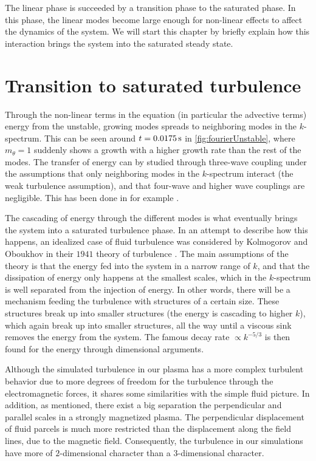 %
The linear phase is succeeded by a transition phase to the saturated phase.
In this phase, the linear modes become large enough for non-linear effects to affect the dynamics of the system.
We will start this chapter by briefly explain how this interaction brings the system into the saturated steady state.

\section{Transition to saturated turbulence}
Through the non-linear terms in the equation (in particular the advective terms) energy from the unstable, growing modes spreads to neighboring modes in the $k$-spectrum.
This can be seen around $t=0.0175\, \text{s}$ in \cref{fig:fourierUnstable}, where $m_\theta=1$ suddenly shows a growth with a higher growth rate than the rest of the modes.
The transfer of energy can by studied through three-wave coupling under the assumptions that only neighboring modes in the $k$-spectrum interact (the weak turbulence assumption), and that four-wave and higher wave couplings are negligible.
This has been done in for example \cite{Ritz1989,Knorr1990}.

The cascading of energy through the different modes is what eventually brings the system into a saturated turbulence phase.
In an attempt to describe how this happens, an idealized case of fluid turbulence was considered by Kolmogorov and Oboukhov in their $1941$ theory of turbulence \cite{Kolmogorov1962}.
The main assumptions of the theory is that the energy fed into the system in a narrow range of $k$, and that the dissipation of energy only happens at the smallest scales, which in the $k$-spectrum is well separated from the injection of energy.
In other words, there will be a mechanism feeding the turbulence with structures of a certain size.
These structures break up into smaller structures (the energy is cascading to higher $k$), which again break up into smaller structures, all the way until a viscous sink removes the energy from the system.
The famous decay rate $\propto k^{-5/3}$ is then found for the energy through dimensional arguments.

Although the simulated turbulence in our plasma has a more complex turbulent behavior due to more degrees of freedom for the turbulence through the electromagnetic forces, it shares some similarities with the simple fluid picture.
In addition, as mentioned, there exist a big separation the perpendicular and parallel scales in a strongly magnetized plasma.
The perpendicular displacement of fluid parcels is much more restricted than the displacement along the field lines, due to the magnetic field.
Consequently, the turbulence in our simulations have more of $2$-dimensional character than a $3$-dimensional character.

